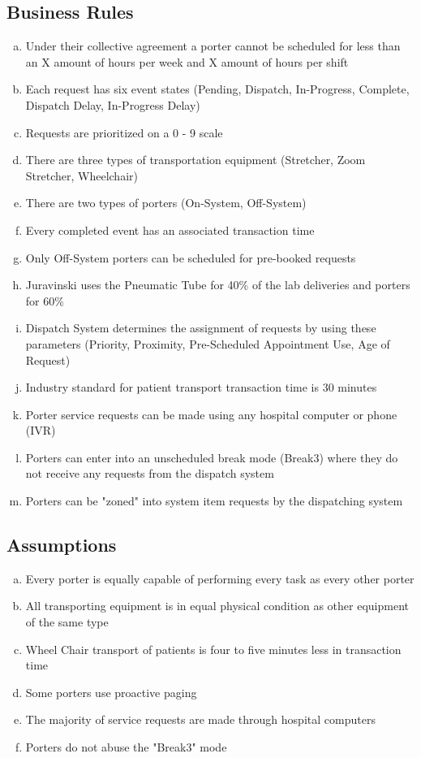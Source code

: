 \documentclass[paper=letter, fontsize=10pt]{scrartcl}
\numberwithin{equation}{section}		%
\numberwithin{figure}{section}			%
\numberwithin{table}{section}				%
\begin{document}
\subsection{Business Rules}
\begin{enumerate}[(a)]
	\item Under their collective agreement a porter cannot be scheduled for less than an X amount of hours per week and X amount of hours per shift 
	\item Each request has six event states (Pending, Dispatch, In-Progress, Complete, Dispatch Delay, In-Progress Delay)
	\item Requests are prioritized on a 0 - 9 scale
	\item There are three types of transportation equipment (Stretcher, Zoom Stretcher, Wheelchair)
	\item There are two types of porters (On-System, Off-System)
	\item Every completed event has an associated transaction time
	\item Only Off-System porters can be scheduled for pre-booked requests
	\item Juravinski uses the Pneumatic Tube for 40\% of the lab deliveries and porters for 60\%
	\item Dispatch System determines the assignment of requests by using these parameters (Priority, Proximity, Pre-Scheduled Appointment Use, Age of Request) 
	\item Industry standard for patient transport transaction time is 30 minutes
	\item Porter service requests can be made using any hospital computer or phone (IVR)
	\item Porters can enter into an unscheduled break mode (Break3) where they do not receive any requests from the dispatch system
	\item Porters can be "zoned" into system item requests by the dispatching system  
\end{enumerate}	    
\subsection{Assumptions}
\begin{enumerate}[(a)]
	\item Every porter is equally capable of performing every task as every other porter
	\item All transporting equipment is in equal physical condition as other equipment of the same type
	\item Wheel Chair transport of patients is four to five minutes less in transaction time
	\item Some porters use proactive paging  
	\item The majority of service requests are made through hospital computers
	\item Porters do not abuse the "Break3" mode
\end{enumerate}
\end{document}
